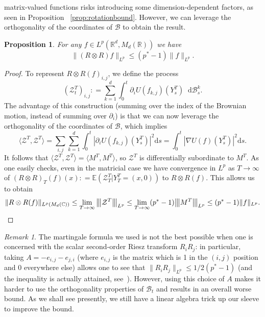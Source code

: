\documentclass[11pt, a4paper]{amsart}
\newtheorem{proposition}{Proposition}[section]
\theoremstyle{definition}
\theoremstyle{remark}
\newtheorem{remark}{Remark}
\newcommand{\R}{\mathbb{R}}
\newcommand*\diff{\mathop{}\!\mathrm{d}}
\newcommand{\vvvert}[1]{
    {\left\vert\kern-0.25ex\left\vert\kern-
    0.25ex\left\vert #1 
    \right\vert\kern-0.25ex\right\vert\kern-
    0.25ex\right\vert}
}
\begin{document}
matrix-valued functions
risks introducing some dimension-dependent 
factors,
as seen in Proposition ~\ref{prop:rotationbound}.
However, we can leverage the orthogonality
of the coordinates of $\mathcal B$ to obtain
the result.
\begin{proposition}\label{prop:upperbound}
For any $f\in L^p(\R^d, M_d(\R))$ we have
\begin{equation*}
    \|(R\otimes R) f\|_{L^p}\le (p^*-1)\|f\|_{L^p}.
\end{equation*}
\end{proposition}
\begin{proof}
To represent $R\otimes R (f)_{i,j}$,
we define the process
\begin{equation*}
\left(\mathcal Z^T_t\right)_{i,j}\mathrel{:}=
\sum_{k=1}^d\int_0^t \partial_i  U(f_{k,j})(Y_s^T)
\diff \mathcal B^k_s.
\end{equation*}
The advantage of this construction
(summing over the index of the Brownian motion, instead
of summing over $\partial_i$) is that we can now
leverage the orthogonality of the coordinates
of $\mathcal B$,
which implies
\begin{equation*}
\langle \mathcal Z^T,\mathcal Z^T\rangle=\sum_{i,j}
\sum_{k=1}^d \int_0^t |\partial_i U(f_{k,j})(Y_s^T)|^2
\mathrm{d}s
=\int_0^t |\nabla U(f)(Y_s^T)|^2\mathrm{d}s.
\end{equation*}
It follows that $\langle \mathcal Z^T,
\mathcal Z^T\rangle=\langle M^T,M^T\rangle$,
so $\mathcal Z^T$ is differentially subordinate
to $M^T$.
As one easily checks,
even in the matricial case we have convergence
in $L^p$ as $T\to \infty$
of $(R\otimes R)_T(f)(x)\mathrel{:}=
\mathbb E\left(\mathcal Z^T_T|Y_T^T=(x,0)\right)
$ to $R\otimes R(f)$. This allows us to obtain
\begin{align*}
\|R\otimes R(f)\|_{L^p(M_d(\mathbb C))}\le 
\lim_{T\to \infty}\vvvert{\mathcal Z^T}_{L^p}\le
\lim_{T\to \infty}(p^*-1)\vvvert{M^T}_{L^p}\le
(p^*-1)\|f\|_{L^p}.
\end{align*}
\end{proof}
\begin{remark}
The martingale formula we used is not the best
possible when one is concerned with
the scalar second-order Riesz transform $R_iR_j$:
in particular, taking $A=-e_{i,j}-e_{j,i}$
(where $e_{i,j}$ is the matrix
which is 1 in the $(i,j)$ 
position and $0$ everywhere else)
allows one to see that
$\|R_{i}R_j\|_{L^p}\le 1/2 (p^*-1)$ (and the 
inequality is actually attained,
see~\cite{Banuelos_Osekowski_2012}). However,
using this choice of $A$ makes it harder to use the
orthogonality properties of $\mathcal B_t$ and results
in an overall worse bound.
As we shall see presently, we still have
a linear algebra trick up our sleeve 
to improve the bound.
\end{remark}
\end{document}

